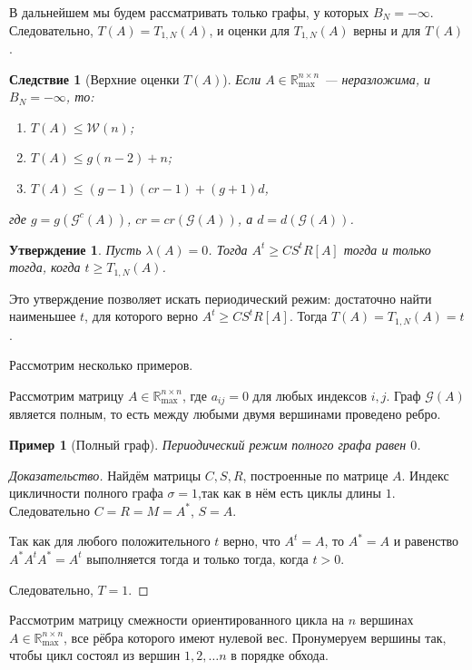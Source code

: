 \documentclass[12pt]{article}
\newtheorem{proposition}[theorem]{Утверждение}
\newtheorem{corollary}[theorem]{Следствие}
\newtheorem{example}[theorem]{Пример}
\theoremstyle{definition}
\begin{document}
В дальнейшем мы будем рассматривать только графы, у которых $B_N = -\infty$. Следовательно, $T(A) = T_{1, N}(A)$, и оценки для $T_{1, N}(A)$ верны и для $T(A)$.

\begin{corollary} [Верхние оценки $T(A)$]
\label{upperBounds}
Если $A \in \mathbb{R}_{\max}^{n \times n}$ --- неразложима, и $B_N = -\infty$, то:
\begin{enumerate} 
    \item $T(A) \le \mathcal{W}(n)$;
    \item $T(A) \le g(n - 2) + n$;
    \item $T(A) \le (g - 1)(cr - 1) + (g + 1) d$,
\end{enumerate}
где $g = g(\mathcal{G}^c(A))$, $cr = cr(\mathcal{G}(A))$, а $d = d(\mathcal{G}(A))$.
\end{corollary}

\begin{proposition} \cite[лемма 2.3]{bounds}
\label{findT1}
Пусть $\lambda(A) = 0$. Тогда $A^t \ge CS^tR[A]$ тогда и только тогда, когда $t \ge T_{1,N}(A)$.
\end{proposition}

Это утверждение позволяет искать периодический режим: достаточно найти наименьшее $t$, для которого верно $A^t \ge CS^tR[A]$. Тогда $T(A) = T_{1, N}(A) = t$.

Рассмотрим несколько примеров.

Рассмотрим матрицу $A \in \mathbb{R}_{\max}^{n \times n}$, где $a_{ij} = 0$ для любых индексов $i, j$. Граф $\mathcal{G}(A)$ является полным, то есть между любыми двумя вершинами проведено ребро.

\begin{example} [Полный граф]
Периодический режим полного графа равен $0$.
\end{example}
\begin{proof}[Доказательство]
Найдём матрицы $C, S, R$, построенные по матрице $A$. Индекс цикличности полного графа $\sigma = 1$,так как в нём есть циклы длины $1$. Следовательно $C = R = M = A^*$, $S = A$.

Так как для любого положительного $t$ верно, что $A^t = A$, то $A^* = A$ и равенство $A^*A^tA^* = A^t$ выполняется тогда и только тогда, когда $t > 0$.

Следовательно, $T = 1$.
\end{proof}

Рассмотрим матрицу смежности ориентированного цикла на $n$ вершинах $A \in \mathbb{R}_{\max}^{n \times n}$, все рёбра которого имеют нулевой вес. Пронумеруем вершины так, чтобы цикл состоял из вершин $1, 2, \dots n$ в порядке обхода.
\end{document}
